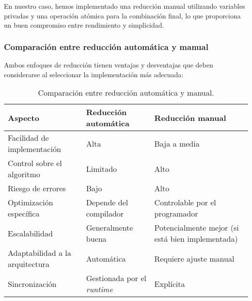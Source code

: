             En nuestro caso, hemos implementado una reducción manual utilizando variables privadas y una operación atómica para la combinación final, lo que proporciona un buen compromiso entre rendimiento y simplicidad.

        \subsubsection{Comparación entre reducción automática y manual}
        
            Ambos enfoques de reducción tienen ventajas y desventajas que deben considerarse al seleccionar la implementación más adecuada:
            
            \begin{table}[H]
                \centering
                \begin{adjustbox}{width=\textwidth, keepaspectratio}
                    \begin{tabular}{|l|l|l|}
                        \hline
                        \textbf{Aspecto} & \textbf{Reducción automática} & \textbf{Reducción manual} \\
                        \hline
                        Facilidad de implementación & Alta & Baja a media \\
                        \hline
                        Control sobre el algoritmo & Limitado & Alto \\
                        \hline
                        Riesgo de errores & Bajo & Alto \\
                        \hline
                        Optimización específica & Depende del compilador & Controlable por el programador \\
                        \hline
                        Escalabilidad & Generalmente buena & Potencialmente mejor (si está bien implementada) \\
                        \hline
                        Adaptabilidad a la arquitectura & Automática & Requiere ajuste manual \\
                        \hline
                        Sincronización & Gestionada por el \textit{runtime} & Explícita \\
                        \hline
                    \end{tabular}
                \end{adjustbox}
                \caption{Comparación entre reducción automática y manual.}
                \label{tab}
            \end{table}
            
